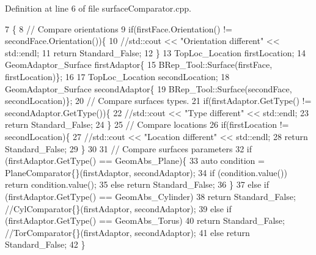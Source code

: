 Definition at line 6 of file surface\+Comparator.\+cpp.


\begin{DoxyCode}
7                                                                                 \{
8     \textcolor{comment}{// Compare orientations}
9     \textcolor{keywordflow}{if}(firstFace.Orientation() != secondFace.Orientation())\{
10         \textcolor{comment}{//std::cout << "Orientation different" << std::endl;}
11         \textcolor{keywordflow}{return} Standard\_False;
12     \}
13     TopLoc\_Location firstLocation;
14     GeomAdaptor\_Surface firstAdaptor\{
15         BRep\_Tool::Surface(firstFace, firstLocation)\};
16 
17     TopLoc\_Location secondLocation;
18     GeomAdaptor\_Surface secondAdaptor\{
19         BRep\_Tool::Surface(secondFace, secondLocation)\};
20     \textcolor{comment}{// Compare surfaces types.}
21     \textcolor{keywordflow}{if}(firstAdaptor.GetType() != secondAdaptor.GetType())\{
22         \textcolor{comment}{//std::cout << "Type different" << std::endl;}
23         \textcolor{keywordflow}{return} Standard\_False;
24     \}
25     \textcolor{comment}{// Compare locations}
26     \textcolor{keywordflow}{if}(firstLocation != secondLocation)\{
27         \textcolor{comment}{//std::cout << "Location different" << std::endl;}
28         \textcolor{keywordflow}{return} Standard\_False;
29     \}
30 
31     \textcolor{comment}{// Compare surfaces parameters}
32     \textcolor{keywordflow}{if} (firstAdaptor.GetType() == GeomAbs\_Plane)\{
33         \textcolor{keyword}{auto} condition = PlaneComparator\{\}(firstAdaptor, secondAdaptor);
34         \textcolor{keywordflow}{if} (condition.value()) \textcolor{keywordflow}{return} condition.value();
35         \textcolor{keywordflow}{else} \textcolor{keywordflow}{return} Standard\_False;
36     \}
37     \textcolor{keywordflow}{else} \textcolor{keywordflow}{if} (firstAdaptor.GetType() == GeomAbs\_Cylinder)
38         \textcolor{keywordflow}{return} Standard\_False; \textcolor{comment}{//CylComparator\{\}(firstAdaptor, secondAdaptor);}
39     \textcolor{keywordflow}{else} \textcolor{keywordflow}{if} (firstAdaptor.GetType() == GeomAbs\_Torus)
40         \textcolor{keywordflow}{return} Standard\_False; \textcolor{comment}{//TorComparator\{\}(firstAdaptor, secondAdaptor);}
41     \textcolor{keywordflow}{else} \textcolor{keywordflow}{return} Standard\_False;
42 \}
\end{DoxyCode}
\mbox{\label{classMcCAD_1_1Tools_1_1SurfaceComparator_a4c95d31c14ea0c9f442d378ab65d9b1f}} 
